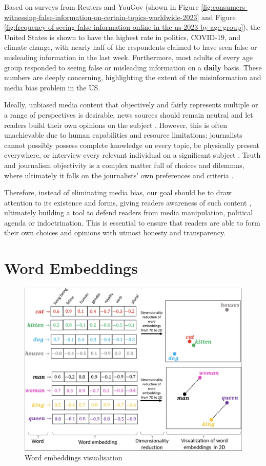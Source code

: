 Based on surveys from Reuters and YouGov (shown in Figure \ref{fig:consumers-witnessing-false-information-on-certain-topics-worldwide-2023} and Figure \ref{fig:frequency-of-seeing-false-information-online-in-the-us-2023-by-age-group}), the United States is shown to have the highest rate in politics, COVID-19, and climate change, with nearly half of the respondents claimed to have seen false or misleading information in the last week. Furthermore, most adults of every age group responded to seeing false or misleading information on a \textbf{daily} basis. These numbers are deeply concerning, highlighting the extent of the misinformation and media bias problem in the US.

Ideally, unbiased media content that objectively and fairly represents multiple or a range of perspectives is desirable, news sources should remain neutral and let readers build their own opinions on the subject \cite{reuters-2021-digital-news-report}. However, this is often unachievable due to human capabilities and resource limitations; journalists cannot possibly possess complete knowledge on every topic, be physically present everywhere, or interview every relevant individual on a significant subject \cite{allsides-2022-bias-definition}. Truth and journalism objectivity is a complex matter full of choices and dilemmas, where ultimately it falls on the journalists' own preferences and criteria \cite{boudana-2011-journalistic-objectivity}.

Therefore, instead of eliminating media bias, our goal should be to draw attention to its existence and forms, giving readers awareness of such content \cite{spinde-2024-taxonomy}, ultimately building a tool to defend readers from media manipulation, political agenda or indoctrination. This is essential to ensure that readers are able to form their own choices and opinions with utmost honesty and transparency.


\section{Word Embeddings}

\begin{figure}[htbp]
    \centering
    \includegraphics[width=0.9\linewidth]{images/word_embeddings.png}
    \caption{Word embeddings visualisation \cite{narayanan-2019-word-embeddings}}
    \label{fig:word-embeddings}
\end{figure}

